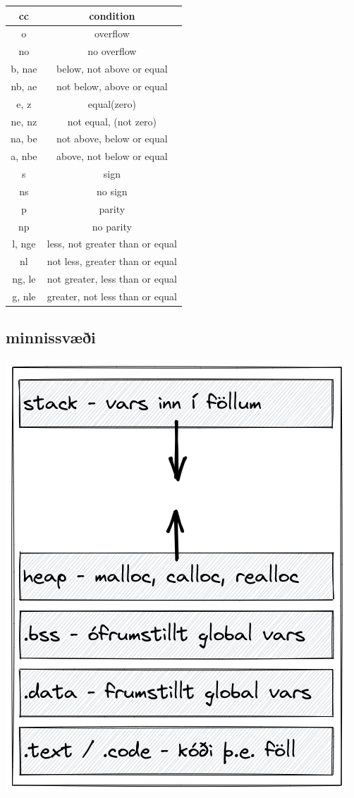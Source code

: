 \documentclass{article}
\begin{document}
\begin{tabular}{|c|c|}
\hline
     \textbf{cc}& \textbf{condition}  \\ \hline
    o  & overflow \\ \hline
    no & no overflow \\ \hline
    b, nae & below, not above or equal \\ \hline
    nb, ae & not below, above or equal \\ \hline
    e, z & equal(zero) \\ \hline
    ne, nz & not equal, (not zero) \\ \hline
    na, be & not above, below or equal \\ \hline
    a, nbe & above, not below or equal \\ \hline
    s & sign \\ \hline
    ns & no sign \\ \hline
    p & parity \\ \hline
    np & no parity \\\hline
    l, nge & less, not greater than or equal \\ \hline
    nl & not less, greater than or equal \\ \hline
    ng, le & not greater, less than or equal\\ \hline
    g, nle & greater, not less than or equal \\ \hline
\end{tabular}

\subsection{minnissvæði}


\includegraphics[scale = 0.4]{myndir/minni.excalidraw.png}
\end{document}
